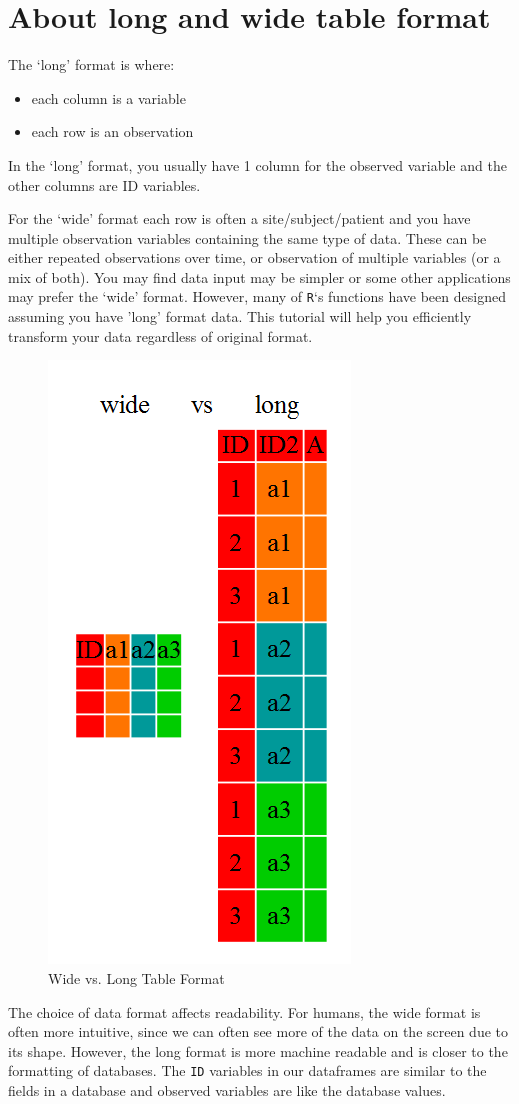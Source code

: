 \documentclass[]{book}
\providecommand{\tightlist}{%
  \setlength{\itemsep}{0pt}\setlength{\parskip}{0pt}}
\theoremstyle{definition}
\theoremstyle{definition}
\theoremstyle{definition}
\theoremstyle{remark}
\begin{document}
\section{About long and wide table
format}\label{about-long-and-wide-table-format}

The `long' format is where:

\begin{itemize}
\tightlist
\item
  each column is a variable
\item
  each row is an observation
\end{itemize}

In the `long' format, you usually have 1 column for the observed
variable and the other columns are ID variables.

For the `wide' format each row is often a site/subject/patient and you
have multiple observation variables containing the same type of data.
These can be either repeated observations over time, or observation of
multiple variables (or a mix of both). You may find data input may be
simpler or some other applications may prefer the `wide' format.
However, many of \texttt{R}`s functions have been designed assuming you
have 'long' format data. This tutorial will help you efficiently
transform your data regardless of original format.

\begin{figure}
\includegraphics[width=0.3\linewidth]{img/wide-vs-long} \caption{Wide vs. Long Table Format}\label{fig:wide-vs-long}
\end{figure}

The choice of data format affects readability. For humans, the wide
format is often more intuitive, since we can often see more of the data
on the screen due to its shape. However, the long format is more machine
readable and is closer to the formatting of databases. The \texttt{ID}
variables in our dataframes are similar to the fields in a database and
observed variables are like the database values.
\end{document}
